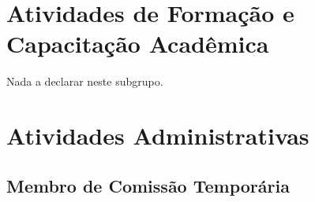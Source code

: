 \documentclass[a4paper,oneside,10pt]{article}
\begin{document}
\newpage
\section{Atividades de Forma\c{c}\~{a}o e Capacita\c{c}\~{a}o Acad\^{e}mica}
\vspace{0.3cm}


Nada a declarar neste subgrupo.
%
%
%
%


\newpage
\section{Atividades Administrativas}
\vspace{0.3cm}


\subsection{Membro de Comiss\~{a}o Tempor\'{a}ria}
\vspace{0.3cm}
\end{document}
